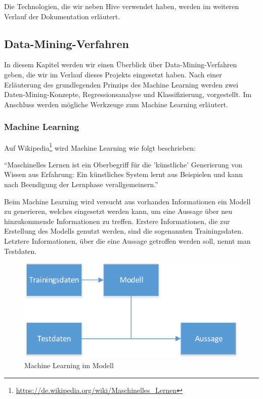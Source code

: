 Die Technologien, die wir neben Hive verwendet haben, werden im weiteren Verlauf der Dokumentation erläutert.


\subsection{Data-Mining-Verfahren}
In diesem Kapitel werden wir einen Überblick über Data-Mining-Verfahren geben, die wir im Verlauf dieses Projekts eingesetzt haben. Nach einer Erläuterung des grundlegenden Prinzips des Machine Learning werden zwei Daten-Mining-Konzepte, Regressionsanalyse und Klassifizierung, vorgestellt. Im Anschluss werden mögliche Werkzeuge zum Machine Learning erläutert.

\subsubsection{Machine Learning}
\label{subsubSec:MachineLearning}
Auf Wikipedia\footnote{\url{https://de.wikipedia.org/wiki/Maschinelles_Lernen}} wird Machine Learning wie folgt beschrieben: 

\begin{center}
“Maschinelles Lernen ist ein Oberbegriff für die 'künstliche' Generierung von Wissen aus Erfahrung: Ein künstliches System lernt aus Beispielen und kann nach Beendigung der Lernphase verallgemeinern.”
\end{center}

Beim Machine Learning wird versucht aus vorhanden Informationen ein Modell zu generieren, welches eingesetzt werden kann, um eine Aussage über neu hinzukommende Informationen zu treffen. Erstere Informationen, die zur Erstellung des Modells genutzt werden, sind die sogenannten Trainingsdaten. Letztere Informationen, über die eine Aussage getroffen werden soll, nennt man Testdaten.

\begin{figure}[H]
\centering
\includegraphics[width=0.7\linewidth]{Bilder/DataMining}
\caption{Machine Learning im Modell}
\label{fig:MachineLearning}
\end{figure}

